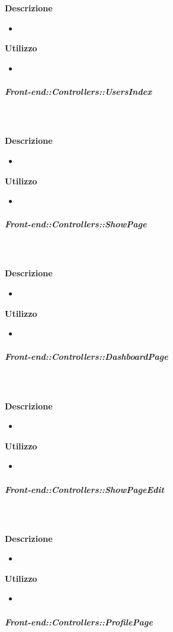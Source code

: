         \textbf{\\ \\ Descrizione} 
          \begin{itemize}
            \item[] 
          \end{itemize}      
        \textbf{Utilizzo}  
          \begin{itemize}
            \item[] 
          \end{itemize}
      \subparagraph{Front-end::Controllers::UsersIndex}
        
        \textbf{\\ \\ Descrizione} 
          \begin{itemize}
            \item[] 
          \end{itemize}      
        \textbf{Utilizzo}  
          \begin{itemize}
            \item[] 
          \end{itemize}
      \subparagraph{Front-end::Controllers::ShowPage}
        
        \textbf{\\ \\ Descrizione} 
          \begin{itemize}
            \item[] 
          \end{itemize}      
        \textbf{Utilizzo}  
          \begin{itemize}
            \item[] 
          \end{itemize}
      \subparagraph{Front-end::Controllers::DashboardPage}
        
        \textbf{\\ \\ Descrizione} 
          \begin{itemize}
            \item[] 
          \end{itemize}      
        \textbf{Utilizzo}  
          \begin{itemize}
            \item[] 
          \end{itemize}
      \subparagraph{Front-end::Controllers::ShowPageEdit}
        
        \textbf{\\ \\ Descrizione} 
          \begin{itemize}
            \item[] 
          \end{itemize}      
        \textbf{Utilizzo}  
          \begin{itemize}
            \item[] 
          \end{itemize}
      \subparagraph{Front-end::Controllers::ProfilePage}
        
